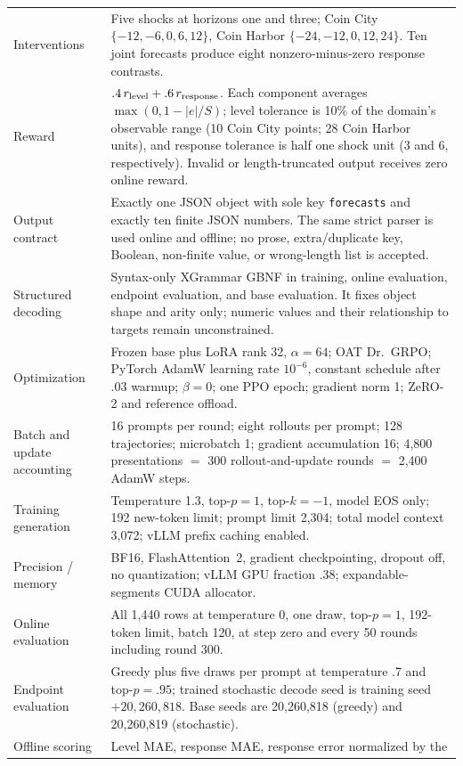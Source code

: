 \begin{center}
\begin{minipage}{\linewidth}
\begin{tabular}{p{.29\linewidth}p{.66\linewidth}}
Interventions & Five shocks at horizons one and three; Coin City
$\{-12,-6,0,6,12\}$, Coin Harbor $\{-24,-12,0,12,24\}$. Ten joint forecasts
produce eight nonzero-minus-zero response contrasts. \\
Reward & $.4\,r_{\rm level}+.6\,r_{\rm response}$. Each component averages
$\max(0,1-|e|/S)$; level tolerance is 10\% of the domain's observable range
(10 Coin City points; 28 Coin Harbor units), and response tolerance is half one
shock unit (3 and 6, respectively). Invalid or length-truncated output receives
zero online reward. \\
Output contract & Exactly one JSON object with sole key
\texttt{forecasts} and exactly ten finite JSON numbers. The same strict parser
is used online and offline; no prose, extra/duplicate key, Boolean, non-finite
value, or wrong-length list is accepted. \\
Structured decoding & Syntax-only XGrammar GBNF in training, online evaluation,
endpoint evaluation, and base evaluation. It fixes object shape and arity only;
numeric values and their relationship to targets remain unconstrained. \\
Optimization & Frozen base plus LoRA rank 32, $\alpha=64$; OAT Dr.~GRPO;
PyTorch AdamW learning rate $10^{-6}$, constant schedule after .03 warmup;
$\beta=0$; one PPO epoch; gradient norm 1; ZeRO-2 and reference offload. \\
Batch and update accounting & 16 prompts per round; eight rollouts per prompt;
128 trajectories; microbatch 1; gradient accumulation 16; 4,800 presentations
$=$ 300 rollout-and-update rounds $=$ 2,400 AdamW steps. \\
Training generation & Temperature 1.3, top-$p=1$, top-$k=-1$, model EOS only;
192 new-token limit; prompt limit 2,304; total model context 3,072; vLLM prefix
caching enabled. \\
Precision / memory & BF16, FlashAttention~2, gradient checkpointing, dropout
off, no quantization; vLLM GPU fraction .38; expandable-segments CUDA allocator. \\
Online evaluation & All 1,440 rows at temperature 0, one draw, top-$p=1$,
192-token limit, batch 120, at step zero and every 50 rounds including round 300. \\
Endpoint evaluation & Greedy plus five draws per prompt at temperature .7 and
top-$p=.95$; trained stochastic decode seed is training seed $+20{,}260{,}818$.
Base seeds are 20,260,818 (greedy) and 20,260,819 (stochastic). \\
Offline scoring & Level MAE, response MAE, response error normalized by the

\end{tabular}
\end{minipage}
\end{center}
